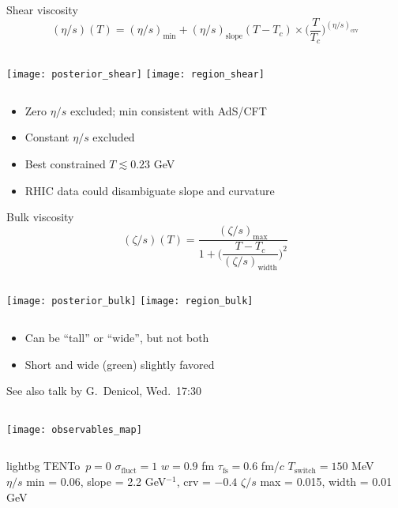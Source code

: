 \documentclass{beamer}
\newcommand{\fullwidth}[1]{
  \begin{columns}
    \column{\paperwidth}
    #1
  \end{columns}
}
\newcommand{\trento}{T\raisebox{-.5ex}{R}ENTo}
\newcommand{\es}{(\eta/s)}
\newcommand{\zs}{(\zeta/s)}
\begin{document}
\begin{frame}{Shear viscosity}
  \begin{equation*}
    \es(T) = \es_\text{min} + \es_\text{slope}(T - T_c) \times \biggl( \frac{T}{T_c} \biggr)^{\es_\text{crv}}
  \end{equation*}
  \begin{columns}
    \texttt{[image: posterior\_shear]}
    \texttt{[image: region\_shear]}
  \end{columns}
  \small
  \begin{itemize}
    \item Zero $\eta/s$ excluded; min consistent with AdS/CFT
    \item Constant $\eta/s$ excluded
    \item Best constrained $T \lesssim 0.23$ GeV
    \item RHIC data could disambiguate slope and curvature
  \end{itemize}
\end{frame}

\begin{frame}{Bulk viscosity}
  \begin{equation*}
    \zs(T) = \frac{
      \zs_\text{max}
    }{
      1 + \biggl( \dfrac{T - T_c}{\zs_\text{width}} \biggr)^2
    }
  \end{equation*}
  \begin{columns}
    \texttt{[image: posterior\_bulk]}
    \texttt{[image: region\_bulk]}
  \end{columns}
  \begin{itemize}
    \item Can be ``tall'' or ``wide'', but not both
    \item Short and wide (green) slightly favored
  \end{itemize}
  \scriptsize\flushright See also talk by G.~Denicol, Wed.~17:30
\end{frame}


\begin{frame}[plain,t]
  \fullwidth{
    \centering
    \texttt{[image: observables\_map]}
  }
  \bigskip
  \scriptsize
  \begin{beamercolorbox}[sep=1ex]{lightbg}
    \trento\ $p = 0$
    \hfill
    $\sigma_\text{fluct} = 1$
    \hfill
    $w = 0.9$ fm
    \hfill
    $\tau_\text{fs} = 0.6$ fm/$c$
    \hfill
    $T_\text{switch} = 150$ MeV
    \\[1ex]
    $\eta/s$ min = 0.06, \enskip slope = 2.2 GeV$^{-1}$, \enskip crv = $-0.4$
    \hfill
  $\zeta/s$ max = 0.015, \enskip width = 0.01 GeV
  \end{beamercolorbox}
\end{frame}
\end{document}
